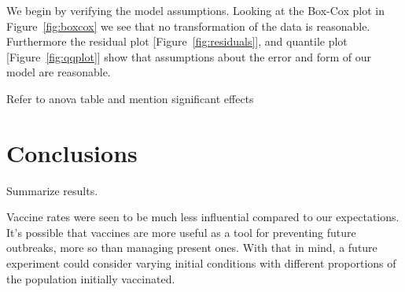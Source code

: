 \documentclass[12pt,a4paper]{article}
\begin{document}
We begin by verifying the model assumptions. Looking at the Box-Cox plot in Figure~\ref{fig:boxcox} we see that no transformation of the data is reasonable. Furthermore the  residual plot [Figure~\ref{fig:residuals}], and quantile plot [Figure~\ref{fig:qqplot}] show that assumptions about the error and form of our model are reasonable.

Refer to anova table and mention significant effects
	
%
%
%

\section{Conclusions}\label{section4}

Summarize results.



Vaccine rates were seen to be much less influential compared to our expectations. It's possible that vaccines are more useful as a tool for preventing future outbreaks, more so than managing present ones. With that in mind, a future experiment could consider varying initial conditions with different proportions of the population initially vaccinated.
\end{document}
